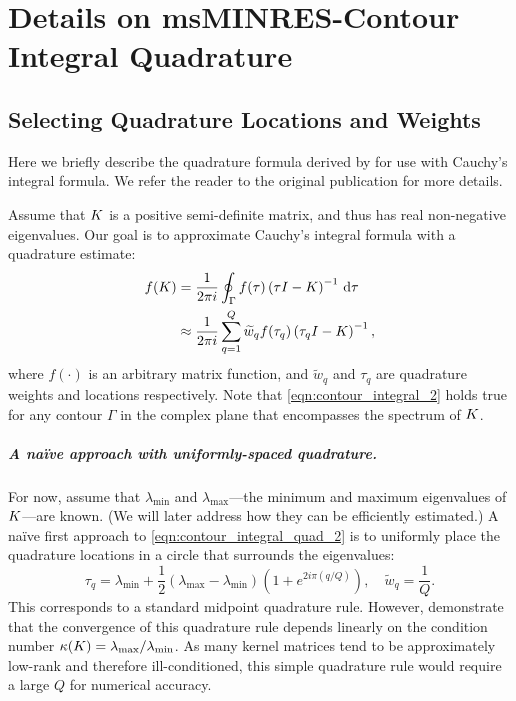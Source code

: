 \chapter{Details on msMINRES-Contour Integral Quadrature}
\label{app:quadrature}

\section{Selecting Quadrature Locations and Weights}
Here we briefly describe the quadrature formula derived by \citet{hale2008computing} for use with Cauchy's integral formula.
We refer the reader to the original publication for more details.

Assume that $K$ is a positive semi-definite matrix, and thus has real non-negative eigenvalues.
Our goal is to approximate Cauchy's integral formula with a quadrature estimate:
%
\begin{align}
	f(K)
  &= \frac{1}{2 \pi i} \oint_\Gamma f(\tau) \left( \tau I - K \right)^{-1} \,\mathrm{d}{\tau}
  \label{eqn:contour_integral_2}
  \\
  &\approx
  \frac{1}{2 \pi i} \sum_{q=1}^Q \widetilde w_q f(\tau_q) \left( \tau_q I - K \right)^{-1},
  \label{eqn:contour_integral_quad_2}
\end{align}
%
where $f(\cdot)$ is an arbitrary matrix function, and $\widetilde w_q$ and $\tau_q$ are quadrature weights and locations respectively.
Note that \cref{eqn:contour_integral_2} holds true for any contour $\Gamma$ in the complex plane that encompasses the spectrum of $K$.

\paragraph{A na\"ive approach with uniformly-spaced quadrature.}
For now, assume that $\lambda_\text{min}$ and $\lambda_\text{max}$---the minimum and maximum eigenvalues of $K$---are known.
(We will later address how they can be efficiently estimated.)
A na\"ive first approach to \cref{eqn:contour_integral_quad_2} is to uniformly place the quadrature locations in a circle that surrounds the eigenvalues:
%
\[
  \tau_q = \lambda_\text{min} + \frac 1 2 \left( \lambda_\text{max} - \lambda_\text{min} \right) \left( 1 + e^{2 i \pi \left( q / Q \right)} \right),
  \quad
  \widetilde w_q = \frac 1 Q.
\]
%
This corresponds to a standard midpoint quadrature rule.
However, \citet{hale2008computing} demonstrate that the convergence of this quadrature rule depends linearly on the condition number $\kappa(K) = \lambda_\text{max} / \lambda_\text{min}$.
As many kernel matrices tend to be approximately low-rank and therefore ill-conditioned, this simple quadrature rule would require a large $Q$ for numerical accuracy.

